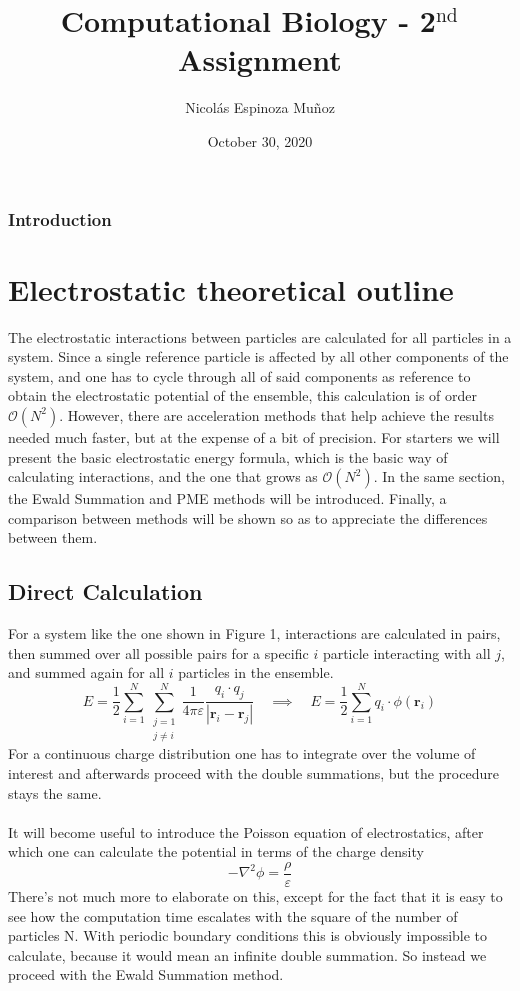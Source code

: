 \documentclass[a4paper, 12pt, notitlepage]{article}
\title{Computational Biology - 2$^\text{nd}$ Assignment}
\author{Nicolás Espinoza Muñoz}
\date{October 30, 2020}
\begin{document}
\maketitle
\subsubsection*{Introduction}
\section*{Electrostatic theoretical outline}
The electrostatic interactions between particles are calculated for all particles in a system. Since a single reference particle is affected by all other components of the system, and one has to cycle through all of said components as reference to obtain the electrostatic potential of the ensemble, this calculation is of order $\mathcal{O}(N^2)$. However, there are acceleration methods that help achieve the results needed much faster, but at the expense of a bit of precision. For starters we will present the basic electrostatic energy formula, which is the basic way of calculating interactions, and the one that grows as $\mathcal{O}(N^2)$. In the same section, the Ewald Summation and PME methods will be introduced. Finally, a comparison between methods will be shown so as to appreciate the differences between them.
\subsection*{Direct Calculation}
For a system like the one shown in Figure 1, interactions are calculated in pairs, then summed over all possible pairs for a specific $i$ particle interacting with all $j$, and summed again for all $i$ particles in the ensemble.
\begin{equation}
E = \frac{1}{2}\sum_{i = 1}^{N}\sum_{\substack{j=1\\j\neq i}}^{N}\frac{1}{4\pi\varepsilon}\frac{q_i\cdot q_j}{|\mathbf{r}_i - \mathbf{r}_j|}\quad \implies \quad E = \frac{1}{2}\sum_{i=1}^{N}q_i\cdot\phi(\mathbf{r}_i)\label{eq:eq1}
\end{equation}
For a continuous charge distribution one has to integrate over the volume of interest and afterwards proceed with the double summations, but the procedure stays the same.\\\\
It will become useful to introduce the Poisson equation of electrostatics, after which one can calculate the potential in terms of the charge density
\begin{equation}
	-\nabla^2\phi = \frac{\rho}{\varepsilon}\label{eq:eq2}
\end{equation}
There's not much more to elaborate on this, except for the fact that it is easy to see how the computation time escalates with the square of the number of particles N. With periodic boundary conditions this is obviously impossible to calculate, because it would mean an infinite double summation. So instead we proceed with the Ewald Summation method.
\end{document}
